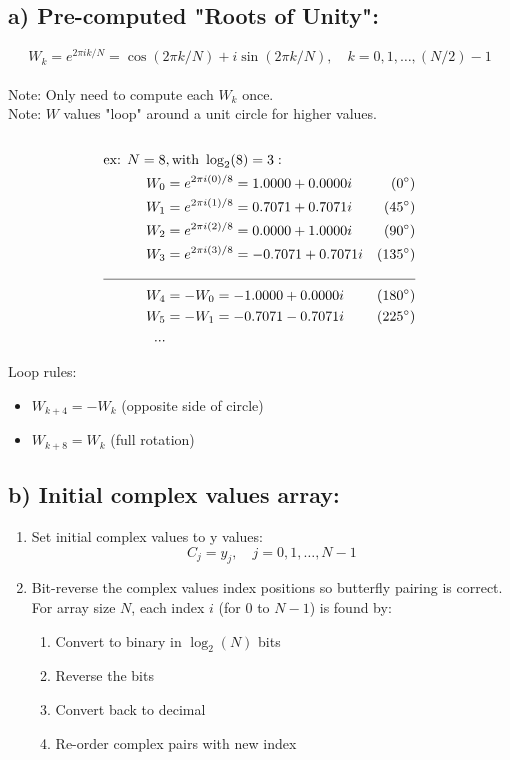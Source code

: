 \documentclass[12pt]{article}
\begin{document}
\subsection*{a) Pre-computed "Roots of Unity":}
\[W_k = e^{2\pi ik/N} = \cos(2\pi k/N) + i\sin(2\pi k/N), \quad k=0,1,\ldots,(N/2)-1\]
\\
Note: Only need to compute each $W_k$ once.\\
Note: $W$ values "loop" around a unit circle for higher values.\\
\\
\begin{align*}
\text{ex: } N=8&, \text{with } \log_2(8)= 3: \\
W_0 &= e^{2\pi i(0)/8} = 1.0000+0.0000i &(0^\circ)\\
W_1 &= e^{2\pi i(1)/8} = 0.7071+0.7071i &(45^\circ)\\
W_2 &= e^{2\pi i(2)/8} = 0.0000+1.0000i &(90^\circ)\\
W_3 &= e^{2\pi i(3)/8} = -0.7071+0.7071i &(135^\circ)\\ 
\cline{1-3}
W_4 &= -W_0 = -1.0000+0.0000i &(180^\circ)\\
W_5 &= -W_1 = -0.7071-0.7071i &(225^\circ)\\
...
\end{align*}

Loop rules:
\begin{itemize}
    \item $W_{k+4} = -W_k$ (opposite side of circle)
    \item $W_{k+8} = W_k$ (full rotation)
\end{itemize}

\subsection*{b) Initial complex values array:}
\begin{enumerate}[label=\roman*)]
    \item Set initial complex values to y values:
    \[C_j = y_j, \quad j=0,1,\ldots,N-1\]
    \item Bit-reverse the complex values index positions so butterfly pairing is correct.\\
    For array size $N$, each index $i$ (for 0 to $N-1$) is found by:
    \begin{enumerate}
        \item Convert to binary in $\log_2(N)$ bits
        \item Reverse the bits
        \item Convert back to decimal
        \item Re-order complex pairs with new index
    \end{enumerate}
\end{enumerate}
\end{document}
